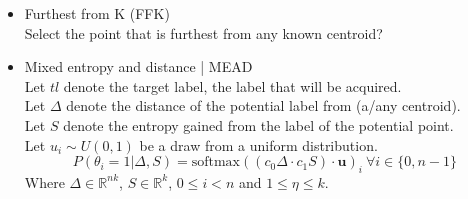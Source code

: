 \begin{itemize}
  \item Furthest from K (FFK)\\
    Select the point that is furthest from any known centroid?
  \item Mixed entropy and distance | MEAD\\

    Let $tl$ denote the target label, the label that will be acquired.\\
    Let $\Delta$ denote the distance of the potential label from (a/any centroid).\\
    Let $S$ denote the entropy gained from the label of the potential point.\\
    Let $u_{i}\sim U(0, 1)$ be a draw from a uniform distribution.
    \begin{equation}
      P(\theta_{i} = 1 | \Delta, S) = \text{softmax}{((c_0 \Delta \cdot c_1 S) \cdot \textbf{u})}_{i}~\forall i \in \{0, n-1\}
    \end{equation}
    Where $\Delta \in \mathbb{R}^{nk}$, $S \in \mathbb{R}^{k}$, $0 \leq i < n$ and $1 \leq \eta \leq k$.
\end{itemize}
